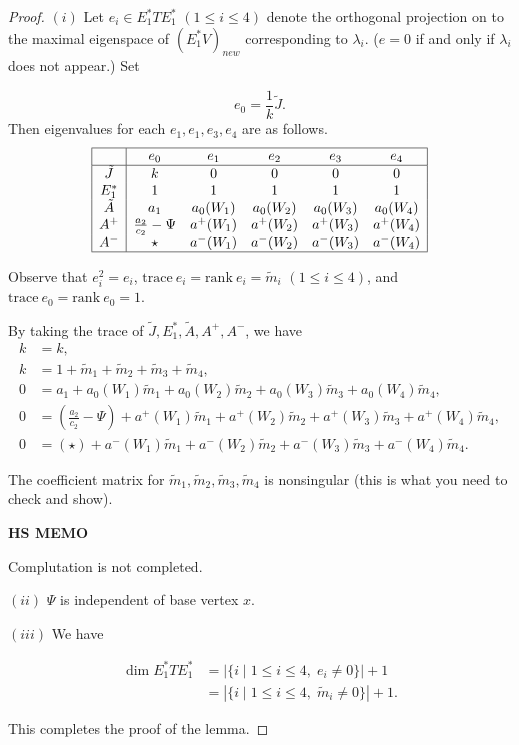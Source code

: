 \documentclass[
]{book}
\theoremstyle{definition}
\theoremstyle{definition}
\theoremstyle{definition}
\theoremstyle{definition}
\theoremstyle{remark}
\begin{document}
\begin{proof}
\leavevmode

\((i)\) Let \(e_i\in E^*_1TE^*_1\) \((1\leq i\leq 4)\) denote the orthogonal projection on to the maximal eigenspace of \((E^*_1V)_{new}\) corresponding to \(\lambda_i\). (\(e=0\) if and only if \(\lambda_i\) does not appear.) Set

\[e_0 = \frac{1}{k}\tilde{J}.\]
Then eigenvalues for each \(e_1, e_1, e_3, e_4\) are as follows.
\[\begin{array}{|c|ccccc|} \hline
\text{} & e_0 & e_1 & e_2 & e_3 & e_4\\
\hline
\tilde{J} & k & 0 & 0 & 0 & 0\\
E^*_1 & 1 & 1 & 1 & 1 & 1 \\
\tilde{A} & a_1 & a_0(W_1) & a_0(W_2) & a_0(W_3) & a_0(W_4)\\
A^+ & \frac{a_2}{c_2}-\Psi & a^+(W_1)  & a^+(W_2)  & a^+(W_3)  & a^+(W_4)\\
A^- & \star & a^-(W_1)  & a^-(W_2)  & a^-(W_3)  & a^-(W_4)\\
\hline
\end{array}\]

Observe that \(e^2_i = e_i\), \(\mathrm{trace} \:e_i = \mathrm{rank}\:e_i = \tilde{m}_i\) \((1\leq i\leq 4)\), and \(\mathrm{trace}\: e_0 = \mathrm{rank}\:e_0 = 1\).

By taking the trace of \(\tilde{J}, E^*_1, \tilde{A}, A^+, A^-\), we have
\begin{align}
k & = k,\\
k & = 1 + \tilde{m}_1 + \tilde{m}_2 + \tilde{m}_3 + \tilde{m}_4,\\
0 & = a_1 + a_0(W_1)\tilde{m}_1 + a_0(W_2)\tilde{m}_2 + a_0(W_3)\tilde{m}_3 + a_0(W_4)\tilde{m}_4,\\
0 & = \left(\frac{a_2}{c_2}-\Psi\right) + a^+(W_1)\tilde{m}_1 + a^+(W_2)\tilde{m}_2 + a^+(W_3)\tilde{m}_3 + a^+(W_4)\tilde{m}_4,\\
0 & = \left(\star\right) + a^-(W_1)\tilde{m}_1 + a^-(W_2)\tilde{m}_2 + a^-(W_3)\tilde{m}_3 + a^-(W_4)\tilde{m}_4.
\end{align}

The coefficient matrix for \(\tilde{m}_1,\tilde{m}_2, \tilde{m}_3,\tilde{m}_4\) is nonsingular (this is what you need to check and show).

\textbf{HS MEMO}

Complutation is not completed.

\((ii)\) \(\Psi\) is independent of base vertex \(x\).

\((iii)\) We have

\begin{align}
\dim E^*_1TE^*_1 & = |\{i\mid 1\leq i\leq 4, \; e_i\neq 0\}| + 1\\
& = |\{i\mid 1\leq i\leq 4, \; \tilde{m}_i\neq 0\}| + 1.
\end{align}

This completes the proof of the lemma.

\end{proof}
\end{document}
